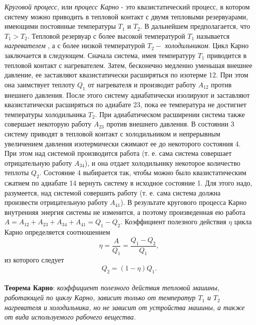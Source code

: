 \documentclass[14pt,a4paper]{scrartcl}
\begin{document}
		\quad \textit{Круговой процесс}, или \textit{процесс Карно} - это квазистатический процесс, в котором систему можно приводить в тепловой контакт	с двумя тепловыми резервуарами, имеющими постоянные температуры $T_1$ и $T_2$. В дальнейшем предполагается, что $T_1 > T_2$. Тепловой резервуар с более высокой температурой $T_1$ называется \textit{нагревателем} , а с более низкой температурой $T_2 -$	\textit{холодильником}. Цикл Карно заключается в следующем. Сначала система, имея температуру $T_1$ приводится в тепловой контакт с нагревателем. Затем, бесконечно медленно уменьшая внешнее давление, ее заставляют квазистатически расширяться по изотерме 12.	При этом она заимствует теплоту $Q_1$ от нагревателя и производит работу $A_{12}$ против внешнего давления. После этого систему адиабатически изолируют и заставляют квазистатически расширяться по адиабате 23, пока ее температура не достигнет температуры холодильника $T_2$. При адиабатическом расширении система также совершает некоторую работу $A_{23}$ против внешнего давления. В состоянии 3 систему приводят в тепловой контакт с холодильником и непрерывным увеличением давления изотермически сжимают ее до некоторого состояния 4.	При этом над системой производится работа (т. е. сама система совершает отрицательную работу $A_{34}$), и она отдает холодильнику некоторое количество теплоты $Q_2$. Состояние 4 выбирается так, чтобы можно было квазистатическим сжатием по адиабате 14 вернуть систему в исходное состояние 1. Для этого надо, разумеется, над системой совершить работу (т. е. сама
		система должна произвести отрицательную работу $A_{41}$). В результате кругового процесса Карно внутренняя энергия системы не изменится, а поэтому произведенная ею работа $A = A_{12} + A_{23} + A_{34} + A_{41} = Q_1 - Q_2$. Коэффициент полезного действия $\eta$ цикла Карно определяется соотношением $$\eta = \dfrac{A}{Q_1} = \dfrac{Q_1-Q_2}{Q_1},$$ из которого следует $$Q_2 = (1-\eta)Q_1.$$\\
		
		\quad \textbf{Теорема Карно}: \textit{коэффициент полезного действия тепловой машины, работающей по циклу Карно, зависит только от температур $T_1$ и $T_2$ нагревателя и холодильника, но не зависит от устройства машины, а также от вида используемого рабочего вещества.}
		
\end{document}

